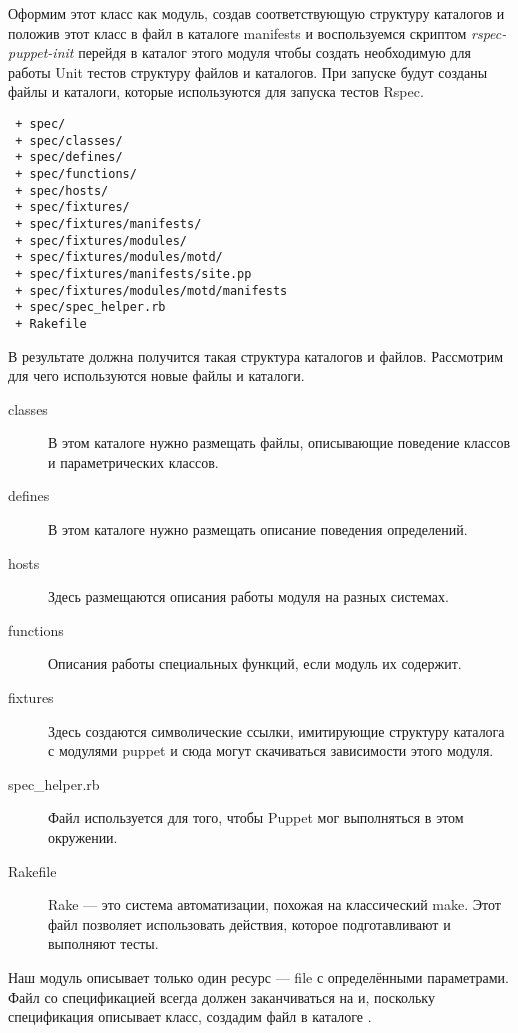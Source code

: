 Оформим этот класс как модуль, создав соответствующую структуру каталогов и положив этот класс в файл  в каталоге manifests и воспользуемся скриптом \emph{rspec-puppet-init} перейдя в каталог этого модуля чтобы создать необходимую для работы Unit тестов структуру файлов и каталогов. При запуске будут созданы файлы и каталоги, которые используются для запуска тестов Rspec.

\begin{verbatim}
 + spec/
 + spec/classes/
 + spec/defines/
 + spec/functions/
 + spec/hosts/
 + spec/fixtures/
 + spec/fixtures/manifests/
 + spec/fixtures/modules/
 + spec/fixtures/modules/motd/
 + spec/fixtures/manifests/site.pp
 + spec/fixtures/modules/motd/manifests
 + spec/spec_helper.rb
 + Rakefile
\end{verbatim}

В результате должна получится такая структура каталогов и файлов. Рассмотрим для чего используются новые файлы и каталоги.


\begin{description}
\item[classes] В этом каталоге нужно размещать файлы, описывающие поведение классов и параметрических классов.
\item[defines] В этом каталоге нужно размещать описание поведения определений.
\item[hosts] Здесь размещаются описания работы модуля на разных системах.
\item[functions] Описания работы специальных функций, если модуль их содержит.
\item[fixtures] Здесь создаются символические ссылки, имитирующие структуру каталога с модулями puppet и сюда могут скачиваться зависимости этого модуля.
\item[spec\_helper.rb] Файл  используется для того, чтобы Puppet мог выполняться в этом окружении.
\item[Rakefile] Rake --- это система автоматизации, похожая на классический make. Этот файл позволяет использовать действия, которое подготавливают и выполняют тесты.
\end{description}

Наш модуль описывает только один ресурс --- file с определёнными параметрами. Файл со спецификацией всегда должен заканчиваться на  и, поскольку спецификация описывает класс, создадим файл в каталоге .

